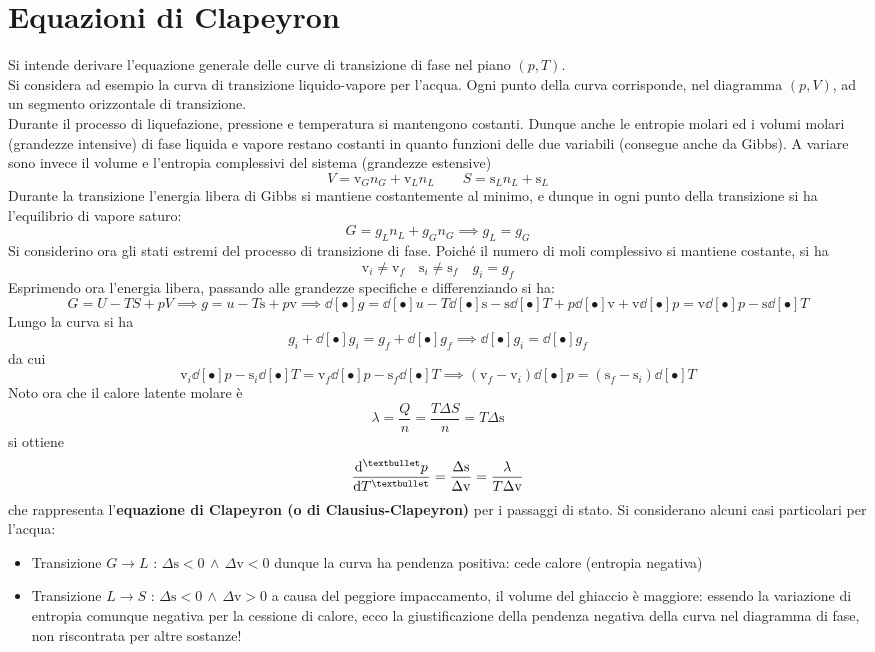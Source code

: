 \documentclass[10pt, oneside]{book}
\newcommand{\molvol}{\mathrm{v}}
\begin{document}
\section{Equazioni di Clapeyron}
Si intende derivare l'equazione generale delle curve di transizione di fase nel piano $(p,T)$.\\
Si considera ad esempio la curva di transizione liquido-vapore per l'acqua. Ogni punto della curva corrisponde, nel diagramma $(p,V)$, ad un segmento orizzontale di transizione.\\
Durante il processo di liquefazione, pressione e temperatura si mantengono costanti. Dunque anche le entropie molari ed i volumi molari (grandezze intensive) di fase liquida e vapore restano costanti in quanto funzioni delle due variabili (consegue anche da Gibbs). A variare sono invece il volume e l'entropia complessivi del sistema (grandezze estensive)
\[V = \molvol_G n_G + \molvol_L n_L \qquad S = \mathrm{s}_L n_L + \mathrm{s}_L\]
Durante la transizione l'energia libera di Gibbs si mantiene costantemente al minimo, e dunque in ogni punto della transizione si ha l'equilibrio di vapore saturo:
\[G = g_L n_L + g_G n_G \implies g_L = g_G\]
Si considerino ora gli stati estremi del processo di transizione di fase. Poiché il numero di moli complessivo si mantiene costante, si ha 
\[\molvol_i \neq \molvol_f \quad \mathrm{s}_i \neq \mathrm{s}_f \quad g_i = g_f\]
Esprimendo ora l'energia libera, passando alle grandezze specifiche e differenziando si ha:
\[G = U - TS + pV \implies g = u - T\mathrm{s} + p\molvol \implies \dd[•]{g} = \dd[•]{u} - T \dd[•]{\mathrm{s}} - \mathrm{s} \dd[•]{T} + p \dd[•]{\molvol} + \molvol \dd[•]{p} = \molvol \dd[•]{p} - \mathrm{s} \dd[•]{T}\]
Lungo la curva si ha
\[g_i + \dd[•]{g_i} = g_f + \dd[•]{g_f} \implies \dd[•]{g_i} = \dd[•]{g_f}\]
da cui
\[\molvol_i \dd[•]{p} - \mathrm{s}_i \dd[•]{T} = \molvol_f \dd[•]{p} - \mathrm{s}_f \dd[•]{T} \implies (\molvol_f - \molvol_i) \dd[•]{p} = (\mathrm{s}_f - \mathrm{s}_i) \dd[•]{T}\]
Noto ora che il calore latente molare è 
\[\lambda = \frac{Q}{n} = \frac{T \Delta S}{n} = T \Delta \mathrm{s}\]
si ottiene 
\[\dv[•]{p}{T} = \frac{\Delta \mathrm{s}}{\Delta \molvol} = \frac{\lambda}{T \Delta \molvol}\]
che rappresenta l'\textbf{equazione di Clapeyron (o di Clausius-Clapeyron)} per i passaggi di stato.
Si considerano alcuni casi particolari per l'acqua:
\begin{itemize}
\item Transizione $G \rightarrow L$ : $\Delta \mathrm{s} < 0 \, \land \, \Delta \molvol < 0$ dunque la curva ha pendenza positiva: cede calore (entropia negativa)
\item Transizione $L \rightarrow S$ : $\Delta \mathrm{s} < 0 \, \land \, \Delta \molvol > 0$ a causa del peggiore impaccamento, il volume del ghiaccio è maggiore: essendo la variazione di entropia comunque negativa per la cessione di calore, ecco la giustificazione della pendenza negativa della curva nel diagramma di fase, non riscontrata per altre sostanze!
\end{itemize}
\end{document}

